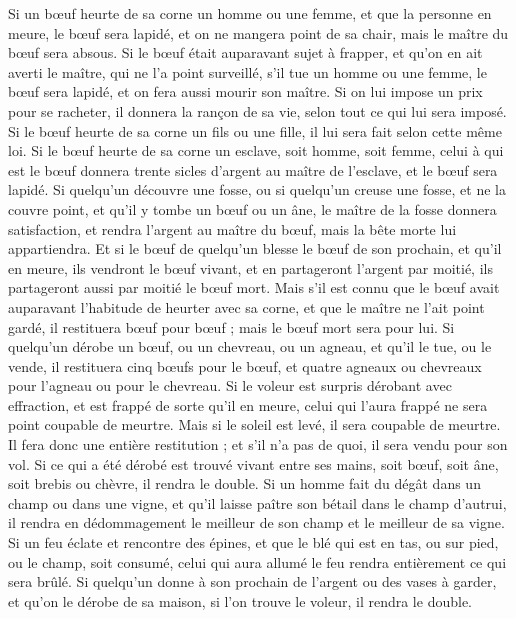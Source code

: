 \begin{multicols}{2}
Si un bœuf heurte de sa corne un homme ou une femme, et que la personne en meure, le bœuf sera lapidé, et on ne mangera point de sa chair, mais le maître du bœuf sera absous.
Si le bœuf était auparavant sujet à frapper, et qu’on en ait averti le maître, qui ne l'a point surveillé, s'il tue un homme ou une femme, le bœuf sera lapidé, et on fera aussi mourir son maître.
Si on lui impose un prix pour se racheter, il donnera la rançon de sa vie, selon tout ce qui lui sera imposé.
Si le bœuf heurte de sa corne un fils ou une fille, il lui sera fait selon cette même loi.
Si le bœuf heurte de sa corne un esclave, soit homme, soit femme, celui à qui est le bœuf donnera trente sicles d'argent au maître de l'esclave, et le bœuf sera lapidé.
Si quelqu'un découvre une fosse, ou si quelqu'un creuse une fosse, et ne la couvre point, et qu'il y tombe un bœuf ou un âne,
le maître de la fosse donnera satisfaction, et rendra l'argent au maître du bœuf, mais la bête morte lui appartiendra.
Et si le bœuf de quelqu'un blesse le bœuf de son prochain, et qu'il en meure, ils vendront le bœuf vivant, et en partageront l'argent par moitié, ils partageront aussi par moitié le bœuf mort.
Mais s'il est connu que le bœuf avait auparavant l’habitude de heurter avec sa corne, et que le maître ne l'ait point gardé, il restituera bœuf pour bœuf ; mais le bœuf mort sera pour lui.
\VerseOne{}Si quelqu'un dérobe un bœuf, ou un chevreau, ou un agneau, et qu'il le tue, ou le vende, il restituera cinq bœufs pour le bœuf, et quatre agneaux ou chevreaux pour l'agneau ou pour le chevreau.
Si le voleur est surpris dérobant avec effraction, et est frappé de sorte qu'il en meure, celui qui l'aura frappé ne sera point coupable de meurtre.
Mais si le soleil est levé, il sera coupable de meurtre. Il fera donc une entière restitution ; et s'il n'a pas de quoi, il sera vendu pour son vol.
Si ce qui a été dérobé est trouvé vivant entre ses mains, soit bœuf, soit âne, soit brebis ou chèvre, il rendra le double.
Si un homme fait du dégât dans un champ ou dans une vigne, et qu’il laisse paître son bétail dans le champ d’autrui, il rendra en dédommagement le meilleur de son champ et le meilleur de sa vigne.
Si un feu éclate et rencontre des épines, et que le blé qui est en tas, ou sur pied, ou le champ, soit consumé, celui qui aura allumé le feu rendra entièrement ce qui sera brûlé.
Si quelqu'un donne à son prochain de l'argent ou des vases à garder, et qu'on le dérobe de sa maison, si l'on trouve le voleur, il rendra le double.

\end{multicols}
